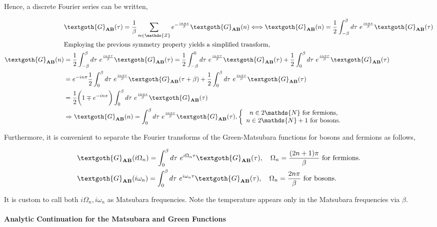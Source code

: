 Hence, a discrete Fourier series can be written, 

\begin{equation}
\begin{split}
    &{\textgoth{G}_{{\bf AB}}}(\tau) = \frac{1}{\beta} \sum_{n \in \mathds{Z}} e^{-\frac{in\pi\tau}{\beta}} {\textgoth{G}_{{\bf AB}}}(n) \Longleftrightarrow {\textgoth{G}_{{\bf AB}}}(n) = \frac{1}{2} \int_{-\beta}^{\beta} d\tau \blanky e^{\frac{in\pi\tau}{\beta}} {\textgoth{G}_{{\bf AB}}}(\tau) \\
    &\textnormal{Employing the previous symmetry property yields a simplified transform, }\\
    {\textgoth{G}_{{\bf AB}}}(n) &= \frac{1}{2} \int_{-\beta}^{\beta} d\tau \blanky e^{\frac{in\pi\tau}{\beta}} {\textgoth{G}_{{\bf AB}}}(\tau) = \frac{1}{2} \int_{-\beta}^{0} d\tau \blanky e^{\frac{in\pi\tau}{\beta}} {\textgoth{G}_{{\bf AB}}}(\tau) + \frac{1}{2} \int_{0}^{\beta} d\tau \blanky e^{\frac{in\pi\tau}{\beta}} {\textgoth{G}_{{\bf AB}}}(\tau) \\
    &= e^{-in\pi} \frac{1}{2} \int_{0}^{\beta} d\tau \blanky e^{\frac{in\pi\tau}{\beta}} {\textgoth{G}_{{\bf AB}}}(\tau + \beta) + \frac{1}{2} \int_{0}^{\beta} d\tau \blanky e^{\frac{in\pi\tau}{\beta}} {\textgoth{G}_{{\bf AB}}}(\tau) \\
    &= \frac{1}{2} \bigg(1 \mp e^{-in\pi}\bigg) \int_{0}^{\beta} d\tau \blanky e^{\frac{in\pi\tau}{\beta}} {\textgoth{G}_{{\bf AB}}}(\tau) \\
    &\Rightarrow {\textgoth{G}_{{\bf AB}}}(n) = \int_{0}^{\beta} d\tau \blanky e^{\frac{in\pi\tau}{\beta}} {\textgoth{G}_{{\bf AB}}}(\tau), \left\{ \begin{array}{cc}
        n \in 2\mathds{N} \textnormal{ for fermions, }   \\
        n \in 2\mathds{N}+1 \textnormal{ for bosons. }
    \end{array} \right.\\
\end{split}
\end{equation}

Furthermore, it is convenient to separate the Fourier transforms of the Green-Matsubara functions for bosons and fermions as follows,

\begin{equation}
    \begin{split}
        &{\textgoth{G}_{{\bf AB}}}(i\Omega_n) = \int_{0}^{\beta} d\tau \blanky e^{i \Omega_n \tau} {\textgoth{G}_{{\bf AB}}}(\tau), \quad \Omega_n = \frac{(2n+1)\pi}{\beta} \textnormal{ for fermions.} \\
        &{\textgoth{G}_{{\bf AB}}}(i\omega_n) = \int_{0}^{\beta} d\tau \blanky e^{i \omega_n \tau} {\textgoth{G}_{{\bf AB}}}(\tau), \quad \Omega_n = \frac{2n\pi}{\beta} \textnormal{ for bosons.}
    \end{split}
\end{equation}

It is custom to call both $i\Omega_n, i\omega_n$ as Matsubara frequencies. Note the temperature appears only in the Matsubara frequencies via $\beta$. \\

\paragraph{Analytic Continuation for the Matsubara and Green Functions}
